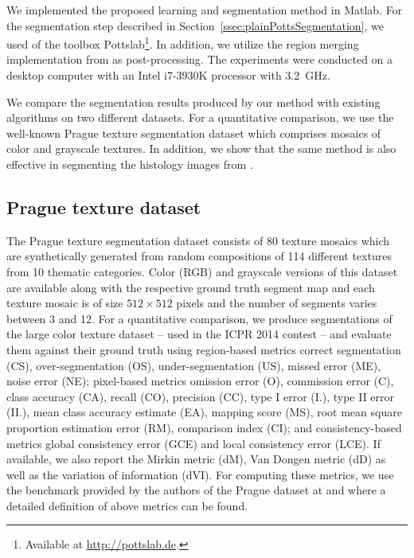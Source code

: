 \documentclass[journal]{IEEEtran}
\begin{document}
We implemented the proposed learning and segmentation method in Matlab. For the segmentation step described in Section~\ref{ssec:plainPottsSegmentation}, we used of the toolbox Pottslab\footnote{Available at \url{http://pottslab.de}.}. In addition, we utilize the region merging implementation from \cite{yuan2015factorization} as post-processing.
The experiments were conducted on a desktop computer with an Intel i7-3930K processor with 3.2~GHz.

We compare the segmentation results produced by our method with existing algorithms on two different datasets. For a quantitative comparison, we use the well-known Prague texture segmentation dataset which comprises mosaics of color and grayscale textures. In addition, we show that the same method is also effective in segmenting the histology images from \cite{mccann2014}.

\subsection{Prague texture dataset} \label{subsec:experiments_prague}
The Prague texture segmentation dataset \cite{haindl2008texture} consists of 80 texture mosaics which are synthetically generated from random compositions of 114 different textures from 10 thematic categories. Color (RGB) and grayscale versions of this dataset are available along with the respective ground truth segment map and each texture mosaic is of size $512 \times 512$ pixels and the number of segments varies between 3 and 12.
For a quantitative comparison, we produce segmentations of the large color texture dataset -- used in the ICPR 2014 contest --
and evaluate them against their ground truth using region-based metrics correct segmentation (CS), over-segmentation (OS), under-segmentation (US), missed error (ME), noise error (NE); pixel-based metrics omission error (O), commission error (C), class accuracy (CA), recall (CO), precision (CC), type I error (I.), type II error (II.), mean class accuracy estimate (EA), mapping score (MS), root mean square proportion estimation error (RM),  comparison index (CI); and consistency-based metrics global consistency error (GCE) and local consistency error (LCE). If available, we also report the Mirkin metric (dM), Van Dongen metric (dD) as well as the variation of information (dVI). For computing these metrics, we use the benchmark provided by the authors of the Prague dataset at \cite{haindl2008online} and where a detailed definition of above metrics can be found.
\end{document}
